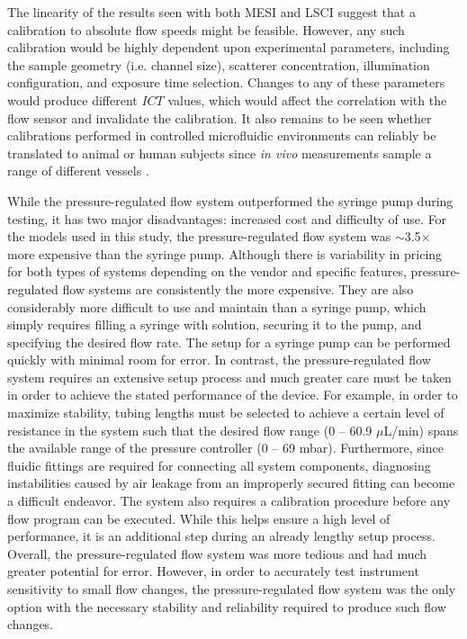 \documentclass[12pt]{spieman}
\begin{document}
\begin{spacing}{2}
The linearity of the results seen with both MESI and LSCI suggest that a calibration to absolute flow speeds might be feasible. However, any such calibration would be highly dependent upon experimental parameters, including the sample geometry (i.e. channel size), scatterer concentration, illumination configuration, and exposure time selection. Changes to any of these parameters would produce different $ICT$ values, which would affect the correlation with the flow sensor and invalidate the calibration. It also remains to be seen whether calibrations performed in controlled microfluidic environments can reliably be translated to animal or human subjects since \textit{in vivo} measurements sample a range of different vessels \cite{Davis:2016ik,Jafari.2020}.

While the pressure-regulated flow system outperformed the syringe pump during testing, it has two major disadvantages: increased cost and difficulty of use. For the models used in this study, the pressure-regulated flow system was $\sim$3.5$\times$ more expensive than the syringe pump. Although there is variability in pricing for both types of systems depending on the vendor and specific features, pressure-regulated flow systems are consistently the more expensive. They are also considerably more difficult to use and maintain than a syringe pump, which simply requires filling a syringe with solution, securing it to the pump, and specifying the desired flow rate. The setup for a syringe pump can be performed quickly with minimal room for error. In contrast, the pressure-regulated flow system requires an extensive setup process and much greater care must be taken in order to achieve the stated performance of the device. For example, in order to maximize stability, tubing lengths must be selected to achieve a certain level of resistance in the system such that the desired flow range (0 -- 60.9 $\mu$L/min) spans the available range of the pressure controller (0 -- 69 mbar). Furthermore, since fluidic fittings are required for connecting all system components, diagnosing instabilities caused by air leakage from an improperly secured fitting can become a difficult endeavor. The system also requires a calibration procedure before any flow program can be executed. While this helps ensure a high level of performance, it is an additional step during an already lengthy setup process. Overall, the pressure-regulated flow system was more tedious and had much greater potential for error. However, in order to accurately test instrument sensitivity to small flow changes, the pressure-regulated flow system was the only option with the necessary stability and reliability required to produce such flow changes.



\end{spacing}
\end{document}
